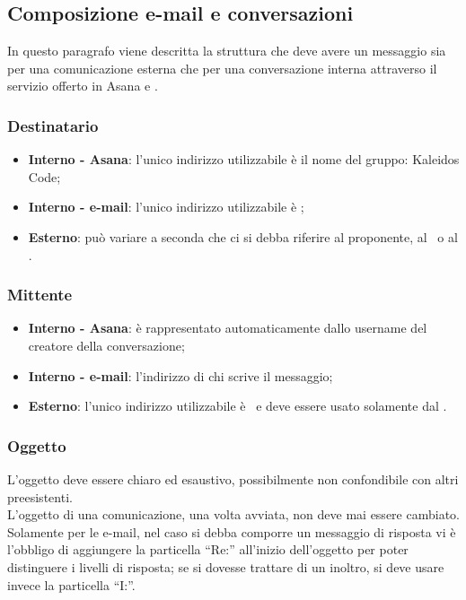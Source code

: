 \documentclass[../NormeDiProgetto.tex]{subfiles}
\begin{document}
			\subsection{Composizione e-mail e conversazioni}
				In questo paragrafo viene descritta la struttura che deve avere
				un messaggio sia per una comunicazione esterna che per una
				conversazione interna attraverso il servizio offerto in Asana e
				.
				\subsubsection{Destinatario}
					\begin{itemize}
						\item \textbf{Interno - Asana}: l'unico indirizzo utilizzabile è
						il nome del gruppo: Kaleidos Code;
						\item \textbf{Interno - e-mail}: l'unico indirizzo utilizzabile è
						\mailkaleidoscode;
						\item \textbf{Esterno}: può variare a seconda che ci si debba
						riferire  al proponente, al \vardanega\ o al \cardin.
					\end{itemize}
				\subsubsection{Mittente}
					\begin{itemize}
						\item \textbf{Interno - Asana}: è rappresentato automaticamente
						dallo username del creatore della conversazione;
						\item \textbf{Interno - e-mail}: l'indirizzo di chi scrive
						il messaggio;
						\item \textbf{Esterno}: l'unico indirizzo utilizzabile è
						\mailkaleidoscode\ e deve essere usato solamente dal
						\responsabilediprogetto.
					\end{itemize}
				\subsubsection{Oggetto}
					L'oggetto deve essere chiaro ed esaustivo, possibilmente non
					confondibile con altri preesistenti.\\
					L'oggetto di una comunicazione, una volta avviata, non deve mai essere cambiato.\\
					Solamente per le e-mail, nel caso si debba
					comporre un messaggio di risposta vi è l'obbligo di aggiungere la
					particella ``Re:'' all'inizio dell'oggetto per poter distinguere i
					livelli di risposta; se si dovesse trattare di un inoltro, si deve
					usare invece la particella ``I:''.
\end{document}
